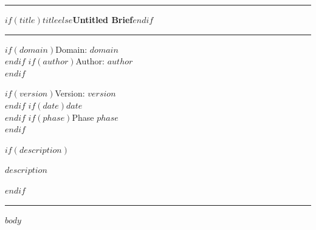 \documentclass[12pt, letterpaper]{article}
\begin{document}

\vspace*{0.2in}
{\color{fp-navy}\rule{\linewidth}{2pt}}
\vspace{8pt}

{\fontsize{22}{26}\selectfont\bfseries\color{fp-navy}
$if(title)$$title$$else$Untitled Brief$endif$}

\vspace{10pt}
{\color{fp-rule}\rule{\linewidth}{0.5pt}}
\vspace{6pt}

\begin{minipage}[t]{0.6\linewidth}
$if(domain)${\small\textsf{\color{fp-meta}Domain: \textbf{$domain$}}}\\[2pt]$endif$
$if(author)${\small\textsf{\color{fp-meta}Author: $author$}}\\[2pt]$endif$
\end{minipage}
\begin{minipage}[t]{0.38\linewidth}
\raggedleft
$if(version)${\small\textsf{\color{fp-meta}Version: $version$}}\\[2pt]$endif$
$if(date)${\small\textsf{\color{fp-meta}$date$}}\\[2pt]$endif$
$if(phase)${\small\textsf{\color{fp-meta}Phase $phase$}}\\[2pt]$endif$
\end{minipage}

$if(description)$
\vspace{14pt}
\noindent\colorbox{fp-navy!6}{%
  \begin{minipage}{\dimexpr\linewidth-2\fboxsep}
    \vspace{8pt}
    \small $description$
    \vspace{8pt}
  \end{minipage}%
}
$endif$

\vspace{16pt}
{\color{fp-rule}\rule{\linewidth}{0.5pt}}
\vspace{14pt}

$body$
\end{document}

